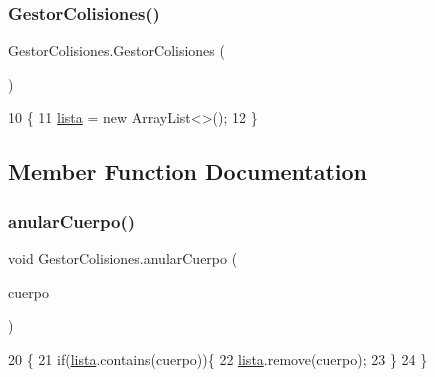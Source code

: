 \subsubsection{\texorpdfstring{Gestor\+Colisiones()}{GestorColisiones()}}
{\footnotesize\ttfamily Gestor\+Colisiones.\+Gestor\+Colisiones (\begin{DoxyParamCaption}{ }\end{DoxyParamCaption})\hspace{0.3cm}{\ttfamily [inline]}}


\begin{DoxyCode}
10                               \{
11         \mbox{\hyperlink{class_gestor_colisiones_a549c1c33a353c2929b060fb9474e90ea}{lista}} = \textcolor{keyword}{new} ArrayList<>();
12     \}
\end{DoxyCode}


\subsection{Member Function Documentation}
\mbox{\label{class_gestor_colisiones_acf5c4b8e58066b5e89c1ec9c16417acd}} 
\subsubsection{\texorpdfstring{anular\+Cuerpo()}{anularCuerpo()}}
{\footnotesize\ttfamily void Gestor\+Colisiones.\+anular\+Cuerpo (\begin{DoxyParamCaption}\item[{\mbox{\hyperlink{interface_i_colisionable}{I\+Colisionable}}}]{cuerpo }\end{DoxyParamCaption})\hspace{0.3cm}{\ttfamily [inline]}}


\begin{DoxyCode}
20                                                   \{
21         \textcolor{keywordflow}{if}(\mbox{\hyperlink{class_gestor_colisiones_a549c1c33a353c2929b060fb9474e90ea}{lista}}.contains(cuerpo))\{
22             \mbox{\hyperlink{class_gestor_colisiones_a549c1c33a353c2929b060fb9474e90ea}{lista}}.remove(cuerpo);
23         \}
24     \}
\end{DoxyCode}
\mbox{\label{class_gestor_colisiones_a74fa3551ed7f8a2f8d045b8978953835}} 
